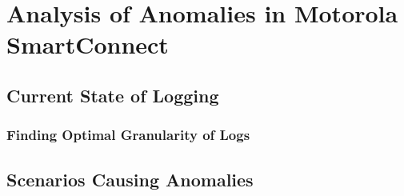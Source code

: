 \chapter{Analysis of Anomalies in Motorola SmartConnect}
\section{Current State of Logging}
\subsection{Finding Optimal Granularity of Logs}
\section{Scenarios Causing Anomalies}